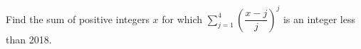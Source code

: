 Find the sum of positive integers $ x $ for which $\sum_{j=1}^4(\dfrac{x-j}{j})^j $ is an integer less than 2018.

